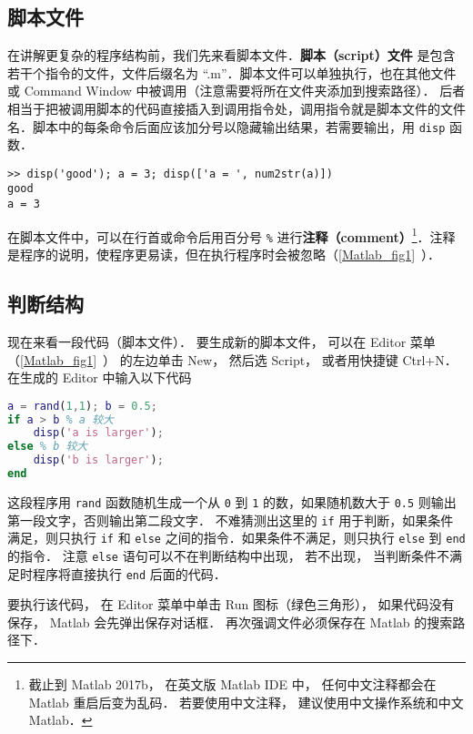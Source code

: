 

\subsection{脚本文件}
在讲解更复杂的程序结构前，我们先来看脚本文件．\textbf{脚本（script）文件} 是包含若干个指令的文件，文件后缀名为 “.m”．脚本文件可以单独执行，也在其他文件或 Command Window 中被调用（注意需要将所在文件夹添加到搜索路径）． 后者相当于把被调用脚本的代码直接插入到调用指令处，调用指令就是脚本文件的文件名．脚本中的每条命令后面应该加分号以隐藏输出结果，若需要输出，用 \verb|disp| 函数．
\begin{lstlisting}[language=matlabC]
>> disp('good'); a = 3; disp(['a = ', num2str(a)])
good
a = 3
\end{lstlisting}
在脚本文件中，可以在行首或命令后用百分号 \verb|%| 进行\textbf{注释（comment）}\footnote{截止到 Matlab 2017b， 在英文版 Matlab IDE 中， 任何中文注释都会在 Matlab 重启后变为乱码． 若要使用中文注释， 建议使用中文操作系统和中文 Matlab．}．注释是程序的说明，使程序更易读，但在执行程序时会被忽略（\autoref{Matlab_fig1}~）．

\subsection{判断结构}
现在来看一段代码（脚本文件）． 要生成新的脚本文件， 可以在 Editor 菜单（\autoref{Matlab_fig1}~） 的左边单击 New， 然后选 Script， 或者用快捷键 Ctrl+N． 在生成的 Editor 中输入以下代码

\begin{lstlisting}[language=matlab]
a = rand(1,1); b = 0.5;
if a > b % a 较大
    disp('a is larger');
else % b 较大
    disp('b is larger');
end
\end{lstlisting}

这段程序用 \verb|rand| 函数随机生成一个从 \verb|0| 到 \verb|1| 的数，如果随机数大于 \verb|0.5| 则输出第一段文字，否则输出第二段文字． 不难猜测出这里的 \verb|if| 用于判断，如果条件满足，则只执行 \verb|if| 和 \verb|else| 之间的指令．如果条件不满足，则只执行 \verb|else| 到 \verb|end| 的指令． 注意 \verb|else| 语句可以不在判断结构中出现， 若不出现， 当判断条件不满足时程序将直接执行 \verb|end| 后面的代码．

要执行该代码， 在 Editor 菜单中单击 Run 图标（绿色三角形）， 如果代码没有保存， Matlab 会先弹出保存对话框． 再次强调文件必须保存在 Matlab 的搜索路径下．

